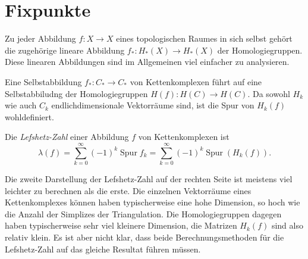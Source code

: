 %
%
%
\section{Fixpunkte
\label{buch:section:fixpunkte}}
Zu jeder Abbildung $f\colon X\to X$ eines topologischen Raumes in sich
selbst gehört die zugehörige lineare Abbildung $f_*\colon H_*(X)\to H_*(X)$
der Homologiegruppen.
Diese linearen Abbildungen sind im Allgemeinen viel einfacher zu
analysieren.

%

Eine Selbstabbildung $f_*\colon C_*\to C_*$ von Kettenkomplexen führt auf
eine Selbstabbiludng der Homologiegruppen $H(f)\colon H(C)\to H(C)$.
Da sowohl $H_k$ wie auch $C_k$ endlichdimensionale Vektorräume sind, 
ist die Spur von $H_k(f)$ wohldefiniert.

\begin{definition}
Die {\em Lefshetz-Zahl} einer Abbildung $f$ von Kettenkomplexen ist
\begin{equation}
\lambda(f)
=
\sum_{k=0}^\infty
(-1)^k \operatorname{Spur}f_k
=
\sum_{k=0}^\infty 
(-1)^k \operatorname{Spur}(H_k(f)).
\label{buch:homologie:lefschetz-zahl}
\end{equation}
\end{definition}

Die zweite Darstellung  der Lefshetz-Zahl auf der rechten Seite ist
meistens viel leichter zu berechnen als die erste.
Die einzelnen Vektorräume eines Kettenkomplexes können haben typischerweise
eine hohe Dimension, so hoch wie die Anzahl der Simplizes der Triangulation.
Die Homologiegruppen dagegen haben typischerweise sehr viel kleinere 
Dimension, die Matrizen $H_k(f)$ sind also relativ klein.
Es ist aber nicht klar, dass beide Berechnungsmethoden für die 
Lefshetz-Zahl auf das gleiche Resultat führen müssen.

